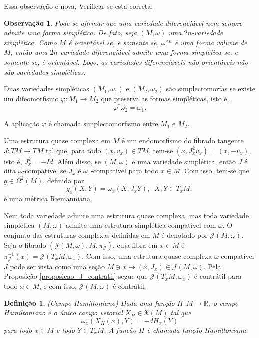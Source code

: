\documentclass[12pt]{book}
\newtheorem{definicao}[teorema]{Definição}
\newtheorem{observacao}[teorema]{Observação}
\newcommand{\campossuaves}[1]{\mathfrak{X}(#1)}
\newcommand{\espacotangenteponto}[2]{T_{#1}#2}
\newcommand{\estruturascomplexas}[2]{\mathcal{J}(#1, #2)}
\newcommand{\estruturascomplexasM}{\estruturascomplexas{M}{\omega}}
\newcommand{\real}[1]{\mathbb{R}^{#1}}
\newcommand{\reta}{\real{}}
\newcommand{\alerta}[1]{{\color{red}#1}}
\begin{document}
	\alerta{Essa observação é nova, Verificar se esta correta.}
	\begin{observacao}
		Pode-se afirmar que uma variedade diferenciável nem sempre admite uma forma simplética. De fato, seja $(M,\omega)$ uma $2n$-variedade simplética. Como $M$ é orientável se, e somente se, $\omega^{\wedge n}$ é uma forma volume de $M$, então uma $2n$-variedade diferenciável admite uma forma simplética se, e somente se, é orientável. Logo, as variedades diferenciáveis não-orientáveis não são variedades simpléticas.
	\end{observacao}
	
	Duas variedades simpléticas $(M_{1}, \omega_{1})$ e $(M_{2}, \omega_{2})$ são simplectomorfas se existe um difeomorfismo $\varphi: M_{1}\to M_{2}$ que preserva as formas simpléticas, isto é,
	$$
	\varphi^{*}\omega_{2}=\omega_{1}.
	$$
	
	A aplicação $\varphi$ é chamada simplectomorfismo entre $M_{1}$ e $M_{2}$.
	
	Uma estrutura quase complexa em $M$ é um endomorfismo do fibrado tangente $J:TM \to TM$ tal que, para todo $(x,v_{x})\in TM$, tem-se $(x, J^{2}_{x}v_{x}) = (x, -v_{x})$, isto é, $J^{2}_{x}=-Id$. Além disso, se $(M, \omega)$ é uma variedade simplética, então $J$ é dita $\omega$-compatível se $J_{x}$ é $\omega_{x}$-compatível para todo $x\in M$. Com isso, tem-se que $g \in \Omega^{2}(M)$, definida por
	$$
	g_{x}(X, Y) =\omega_{x}(X, J_{x}Y),\;\;X, Y\in \espacotangenteponto{x}{M},
	$$
	é uma métrica Riemanniana.

	 Nem toda variedade admite uma estrutura quase complexa, mas toda variedade simplética $(M,\omega)$ admite uma estrutura simplética compatível com $\omega$. O conjunto das estruturas complexas definidas em $M$ é denotado por $\estruturascomplexasM$. Seja o fibrado $(\estruturascomplexasM, M,\pi_{\mathcal{J}})$, cuja fibra em $x\in M$ é $\pi_{\mathcal{J}}^{-1}(x) = \estruturascomplexas{\espacotangenteponto{x}{M}}{\omega_{x}}$. Com isso, uma estrutura quase complexa $\omega$-compatível $J$ pode ser vista como uma seção $M \ni x \mapsto (x, J_{x})\in \estruturascomplexasM$. Pela Proposição \ref{proposicao_J_contratil} segue que $\estruturascomplexas{\espacotangenteponto{x}{M}}{\omega_{x}}$ é contrátil para todo $x\in M$, e com isso, $\estruturascomplexasM$ é contrátil.
	
	\begin{definicao}
		(Campo Hamiltoniano) Dada uma função $H:M\to \reta$, o campo Hamiltoniano é o único campo vetorial $X_{H}\in \campossuaves{M}$ tal que
		$$
		\omega_{x}(X_{H}(x), Y) = -dH_{x}(Y)
		$$
		para todo $x\in M$ e todo $Y \in \espacotangenteponto{x}{M}$. A função $H$ é chamada função Hamiltoniana.
	\end{definicao}
	
\end{document}
